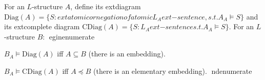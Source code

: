 For an $L$-structure $A$, define its 	ext{diagram} $\mathrm{Diag}(A) = \{S : 	ext{atomic or negation of atomic } L_A	ext{-sentence, s.t. } A_A \models S\}$ and its 	ext{complete diagram} $\mathrm{CDiag}(A) = \{S : L_A	ext{-sentence s.t. } A_A \models S\}$.
For an $L$-structure $B$:
egin{enumerate}
\item[(i)] $B_A \models \mathrm{Diag}(A)$ iff $A \subseteq B$ (there is an embedding).
\item[(ii)] $B_A \models \mathrm{CDiag}(A)$ iff $A \preceq B$ (there is an elementary embedding).
nd{enumerate}
